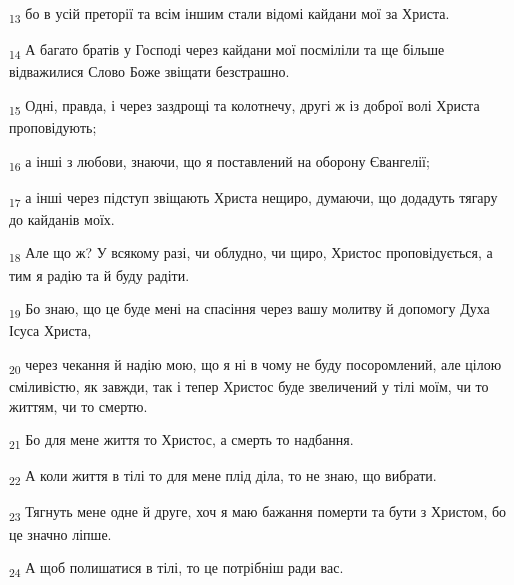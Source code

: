 \begin{tcolorbox}
\textsubscript{13} бо в усій преторії та всім іншим стали відомі кайдани мої за Христа.
\end{tcolorbox}
\begin{tcolorbox}
\textsubscript{14} А багато братів у Господі через кайдани мої посміліли та ще більше відважилися Слово Боже звіщати безстрашно.
\end{tcolorbox}
\begin{tcolorbox}
\textsubscript{15} Одні, правда, і через заздрощі та колотнечу, другі ж із доброї волі Христа проповідують;
\end{tcolorbox}
\begin{tcolorbox}
\textsubscript{16} а інші з любови, знаючи, що я поставлений на оборону Євангелії;
\end{tcolorbox}
\begin{tcolorbox}
\textsubscript{17} а інші через підступ звіщають Христа нещиро, думаючи, що додадуть тягару до кайданів моїх.
\end{tcolorbox}
\begin{tcolorbox}
\textsubscript{18} Але що ж? У всякому разі, чи облудно, чи щиро, Христос проповідується, а тим я радію та й буду радіти.
\end{tcolorbox}
\begin{tcolorbox}
\textsubscript{19} Бо знаю, що це буде мені на спасіння через вашу молитву й допомогу Духа Ісуса Христа,
\end{tcolorbox}
\begin{tcolorbox}
\textsubscript{20} через чекання й надію мою, що я ні в чому не буду посоромлений, але цілою сміливістю, як завжди, так і тепер Христос буде звеличений у тілі моїм, чи то життям, чи то смертю.
\end{tcolorbox}
\begin{tcolorbox}
\textsubscript{21} Бо для мене життя то Христос, а смерть то надбання.
\end{tcolorbox}
\begin{tcolorbox}
\textsubscript{22} А коли життя в тілі то для мене плід діла, то не знаю, що вибрати.
\end{tcolorbox}
\begin{tcolorbox}
\textsubscript{23} Тягнуть мене одне й друге, хоч я маю бажання померти та бути з Христом, бо це значно ліпше.
\end{tcolorbox}
\begin{tcolorbox}
\textsubscript{24} А щоб полишатися в тілі, то це потрібніш ради вас.
\end{tcolorbox}
